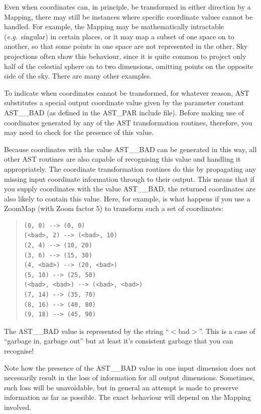 \documentclass[twoside,11pt]{article}
\newcommand{\htmlref}[2]{#1}
\begin{document}
Even when coordinates can, in principle, be transformed in either
direction by a \htmlref{Mapping}{Mapping}, there may still be instances where specific
coordinate values cannot be handled. For example, the Mapping may be
mathematically intractable ({\em{e.g.}}\ singular) in certain places,
or it may map a subset of one space on to another, so that some points
in one space are not represented in the other.  Sky projections often
show this behaviour, since it is quite common to project only half of
the celestial sphere on to two dimensions, omitting points on the
opposite side of the sky. There are many other examples.

To indicate when coordinates cannot be transformed, for whatever
reason, AST substitutes a special output coordinate value given by the
parameter constant AST\_\_BAD (as defined in the AST\_PAR include
file).  Before making use of coordinates generated by any of the AST
transformation routines, therefore, you may need to check for the
presence of this value.

Because coordinates with the value AST\_\_BAD can be generated in this
way, all other AST routines are also capable of recognising this value
and handling it appropriately. The coordinate transformation routines
do this by propagating any missing input coordinate information
through to their output.  This means that if you supply coordinates
with the value AST\_\_BAD, the returned coordinates are also likely to
contain this value. Here, for example, is what happens if you use a
\htmlref{ZoomMap}{ZoomMap} (with \htmlref{Zoom}{Zoom} factor 5) to transform such a set of coordinates:

\begin{quote}
\small
\begin{verbatim}
(0, 0) --> (0, 0)
(<bad>, 2) --> (<bad>, 10)
(2, 4) --> (10, 20)
(3, 6) --> (15, 30)
(4, <bad>) --> (20, <bad>)
(5, 10) --> (25, 50)
(<bad>, <bad>) --> (<bad>, <bad>)
(7, 14) --> (35, 70)
(8, 16) --> (40, 80)
(9, 18) --> (45, 90)
\end{verbatim}
\normalsize
\end{quote}

The AST\_\_BAD value is represented by the string ``$<$bad$>$''. This
is a case of ``garbage in, garbage out'' but at least it's consistent
garbage that you can recognise!

Note how the presence of the AST\_\_BAD value in one input dimension
does not necessarily result in the loss of information for all output
dimensions. Sometimes, such loss will be unavoidable, but in general
an attempt is made to preserve information as far as possible. The
exact behaviour will depend on the Mapping involved.
\end{document}
